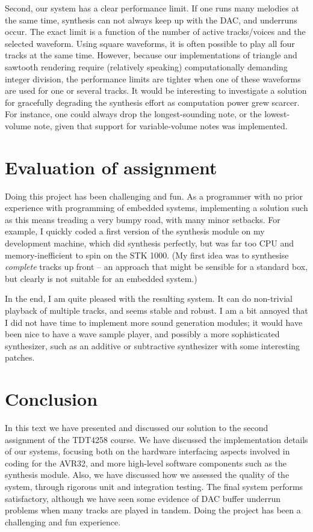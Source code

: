 \documentclass[a4paper,9pt]{article}
\begin{document}
Second, our system has a clear performance limit. If one runs many melodies at
the same time, synthesis can not always keep up with the DAC, and underruns
occur. The exact limit is a function of the number of active tracks/voices
and the selected waveform. Using square waveforms, it is often possible to
play all four tracks at the same time. However, because our implementations of
triangle and sawtooth rendering require (relatively speaking) computationally
demanding integer division, the performance limits are tighter when one of
these waveforms are used for one or several tracks. It would be interesting to
investigate a solution for gracefully degrading the synthesis effort as
computation power grew scarcer. For instance, one could always drop the
longest-sounding note, or the lowest-volume note, given that support for
variable-volume notes was implemented. 

\section{Evaluation of assignment}
\label{sec:eval}
Doing this project has been challenging and fun. As a programmer with no prior
experience with programming of embedded systems, implementing a solution such
as this means treading a very bumpy road, with many minor setbacks. For
example, I quickly coded a first version of the synthesis module on my
development machine, which did synthesis perfectly, but was far too CPU and
memory-inefficient to spin on the STK 1000. (My first idea was to synthesise
\emph{complete} tracks up front -- an approach that might be sensible for a
standard box, but clearly is not suitable for an embedded system.)

In the end, I am quite pleased with the resulting system. It can do
non-trivial playback of multiple tracks, and seems stable and robust. I am a
bit annoyed that I did not have time to implement more sound generation
modules; it would have been nice to have a wave sample player, and possibly a
more sophisticated synthesizer, such as an additive or subtractive synthesizer
with some interesting patches. 

\section{Conclusion}
\label{sec:conclusion}
In this text we have presented and discussed our solution to the second
assignment of the TDT4258 course. 
We have discussed the implementation details of our systems, focusing both on
the hardware interfacing aspects involved in coding for the AVR32, and more
high-level software components such as the synthesis module.
Also, we have discussed how we assessed the quality of the system, through
rigorous unit and integration testing.
The final system performs satisfactory, although we have seen some evidence of
DAC buffer underrun problems when many tracks are played in tandem.  Doing the
project has been a challenging and fun experience.



\end{document}
